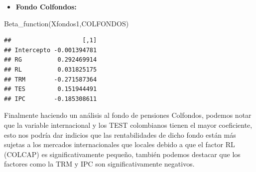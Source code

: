 \documentclass[
  12pt,
]{article}
\newenvironment{Shaded}{\begin{snugshade}}{\end{snugshade}}
\newcommand{\FunctionTok}[1]{\textcolor[rgb]{0.00,0.00,0.00}{#1}}
\newcommand{\NormalTok}[1]{#1}
\providecommand{\tightlist}{%
  \setlength{\itemsep}{0pt}\setlength{\parskip}{0pt}}
\begin{document}
\begin{itemize}
\tightlist
\item
  \textbf{Fondo Colfondos:}
\end{itemize}

\begin{Shaded}
\begin{Highlighting}[]
\FunctionTok{Beta\_function}\NormalTok{(Xfondos1,COLFONDOS)}
\end{Highlighting}
\end{Shaded}

\begin{verbatim}
##                    [,1]
## Intercepto -0.001394781
## RG          0.292469914
## RL          0.031825175
## TRM        -0.271587364
## TES         0.151944491
## IPC        -0.185308611
\end{verbatim}

Finalmente haciendo un análisis al fondo de pensiones Colfondos, podemos
notar que la variable internacional y los TEST colombianos tienen el
mayor coeficiente, esto nos podría dar indicios que las rentabilidades
de dicho fondo están más sujetas a los mercados internacionales que
locales debido a que el factor RL (COLCAP) es significativamente
pequeño, también podemos destacar que los factores como la TRM y IPC son
significativamente negativos.

  
\end{document}
